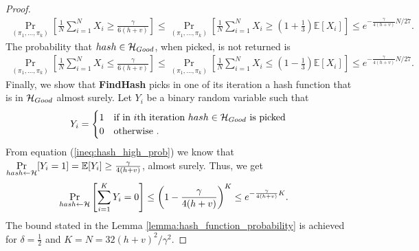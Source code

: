 \begin{proof}
\begin{align*}
  \underset{(\pi_1, \dots, \pi_k)}{\Pr} \left[\frac{1}{N} \sum_{i=1}^{N} X_i \geq \frac{\gamma}{6(h+v)} \right] \leq
  \underset{(\pi_1, \dots, \pi_k)}{\Pr}\left[\frac{1}{N} \sum_{i=1}^{N} X_i \geq (1 + \frac{1}{3}) \mathbb{E}[X_i]\right] \leq
  e^{-{\frac{\gamma}{4(h+v)}} N /27}.
\end{align*}
%
The probability that $hash \in \mathcal{H}_{Good}$, when picked, is not returned is
\begin{align*}
  \underset{(\pi_1, \dots, \pi_k)}{\Pr}\left[\frac{1}{N} \sum_{i=1}^{N} X_i \leq \frac{\gamma}{6(h+v)}\right] \leq
  \underset{(\pi_1, \dots, \pi_k)}{\Pr}\left[\frac{1}{N} \sum_{i=1}^{N} X_i \leq (1 - \frac{1}{3})\mathbb{E}[X_i]\right] \leq e^{-{\frac{\gamma}{4(h+v)}} N /27}.
\end{align*}
%
Finally, we show that \textbf{FindHash} picks in one of its iteration a hash function that is in $\mathcal{H}_{Good}$ almost surely.
Let $Y_i$ be a binary random variable such that
\begin{align*}
  Y_i =
  \begin{cases}
    1 & \text{if in $i$th iteration $hash \in \mathcal{H}_{Good}$ is picked} \\
    0 & \text{otherwise .}
  \end{cases}
\end{align*}
From equation (\ref{ineq:hash_high_prob}) we know that $\underset{hash \leftarrow \mathcal{H}}{\Pr}[Y_i = 1] = \mathbb{E}[Y_i] \geq \frac{\gamma}{4(h+v)}$, almost surely.
Thus, we get
\begin{align*}
  \underset{hash \leftarrow \mathcal{H}}{\Pr}\left[\sum_{i=1}^{K} Y_i = 0\right] &\leq \left(1 - \frac{\gamma}{4(h+v)}\right)^{K} \leq e^{-\frac{\gamma}{4(h+v)} K}.
\end{align*}
The bound stated in the Lemma \ref{lemma:hash_function_probability} is achieved for $\delta = \frac{1}{2}$ and $K = N = 32(h+v)^2/\gamma^2$.
\end{proof}
